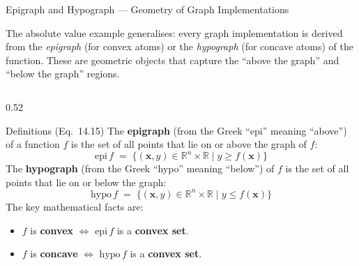 \documentclass[aspectratio=169,10pt]{beamer}
\begin{document}
\begin{frame}[allowframebreaks]{Epigraph and Hypograph --- Geometry of Graph Implementations}

  The absolute value example generalises: every graph implementation is
  derived from the \emph{epigraph} (for convex atoms) or the
  \emph{hypograph} (for concave atoms) of the function.  These are
  geometric objects that capture the ``above the graph'' and ``below
  the graph'' regions.

  \begin{columns}
    \begin{column}{0.52\textwidth}
      \begin{block}{Definitions (Eq.\ 14.15)}
        The \textbf{epigraph} (from the Greek ``epi'' meaning
        ``above'') of a function $f$ is the set of all points that
        lie on or above the graph of $f$:
        \[
          \mathrm{epi}\,f \;=\;
          \bigl\{(\mathbf{x},y)\in\mathbb{R}^n\times\mathbb{R}
          \;\big|\; y \geq f(\mathbf{x})\bigr\}
        \]
        The \textbf{hypograph} (from the Greek ``hypo'' meaning
        ``below'') of $f$ is the set of all points that lie on or
        below the graph:
        \[
          \mathrm{hypo}\,f \;=\;
          \bigl\{(\mathbf{x},y)\in\mathbb{R}^n\times\mathbb{R}
          \;\big|\; y \leq f(\mathbf{x})\bigr\}
        \]
        The key mathematical facts are:
        \begin{itemize}
          \item $f$ is \textbf{convex} $\iff$ $\mathrm{epi}\,f$ is a
                \textbf{convex set}.
          \item $f$ is \textbf{concave} $\iff$ $\mathrm{hypo}\,f$ is
                a \textbf{convex set}.
        \end{itemize}
      \end{block}


\end{column}
\end{columns}
\end{frame}
\end{document}
